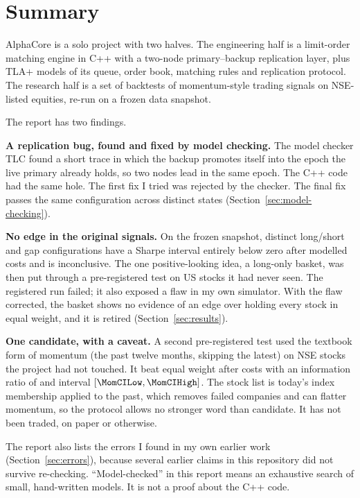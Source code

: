 \section{Summary}
AlphaCore is a solo project with two halves. The engineering half is a limit-order matching engine in C++ with a two-node primary--backup replication layer, plus TLA+ models of its queue, order book, matching rules and replication protocol. The research half is a set of backtests of momentum-style trading signals on NSE-listed equities, re-run on a frozen data snapshot.

The report has two findings.

\textbf{A replication bug, found and fixed by model checking.} The model checker TLC found a short trace in which the backup promotes itself into the epoch the live primary already holds, so two nodes lead in the same epoch. The C++ code had the same hole. The first fix I tried was rejected by the checker. The final fix passes the same configuration across \TlaEnginePrimaryBackupDistinct{} distinct states (Section~\ref{sec:model-checking}).

\textbf{No edge in the original signals.} On the frozen snapshot, \NumSigNegConfigs{} distinct long/short and gap configurations have a Sharpe interval entirely below zero after modelled costs and \NumInconclusiveConfigs{} is inconclusive. The one positive-looking idea, a long-only basket, was then put through a pre-registered test on US stocks it had never seen. The registered run failed; it also exposed a flaw in my own simulator. With the flaw corrected, the basket shows no evidence of an edge over holding every stock in equal weight, and it is retired (Section~\ref{sec:results}).

\textbf{One candidate, with a caveat.} A second pre-registered test used the textbook form of momentum (the past twelve months, skipping the latest) on \MomSymbols{} NSE stocks the project had not touched. It beat equal weight after costs with an information ratio of \MomIR{} and interval $[\MomCILow, \MomCIHigh]$. The stock list is today's index membership applied to the past, which removes failed companies and can flatter momentum, so the protocol allows no stronger word than candidate. It has not been traded, on paper or otherwise.

The report also lists the errors I found in my own earlier work (Section~\ref{sec:errors}), because several earlier claims in this repository did not survive re-checking. ``Model-checked'' in this report means an exhaustive search of small, hand-written models. It is not a proof about the C++ code.
